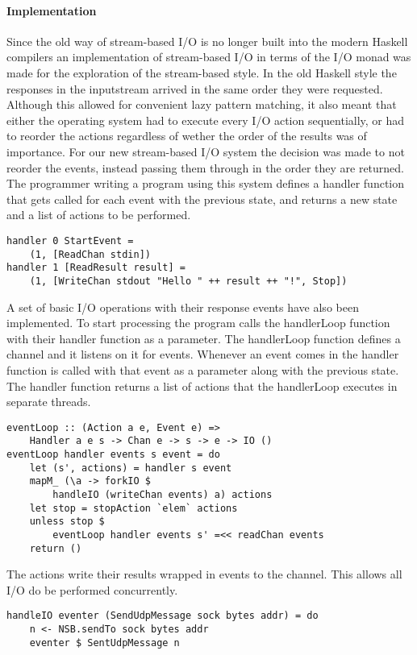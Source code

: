 \paragraph{Implementation}
Since the old way of stream-based I/O is no longer built into the modern Haskell compilers an implementation of stream-based I/O in terms of the I/O monad was made for the exploration of the stream-based style.
In the old Haskell style the responses in the inputstream arrived in the same order they were requested. Although this allowed for convenient lazy pattern matching, it also meant that either the operating system had to execute every I/O action sequentially, or had to reorder the actions regardless of wether the order of the results was of importance. For our new stream-based I/O system the decision was made to not reorder the events, instead passing them through in the order they are returned.
The programmer writing a program using this system defines a handler function that gets called for each event with the previous state, and returns a new state and a list of actions to be performed.
\begin{lstlisting}[caption={Stream-based example}]
handler 0 StartEvent =
    (1, [ReadChan stdin])
handler 1 [ReadResult result] =
    (1, [WriteChan stdout "Hello " ++ result ++ "!", Stop])
\end{lstlisting}
A set of basic I/O operations with their response events have also been implemented.
To start processing the program calls the handlerLoop function with their handler function as a parameter.
The handlerLoop function defines a channel and it listens on it for events. Whenever an event comes in the handler function is called with that event as a parameter along with the previous state. The handler function returns a list of actions that the handlerLoop executes in separate threads. 
\begin{lstlisting}[caption={The eventLoop}]
eventLoop :: (Action a e, Event e) =>
    Handler a e s -> Chan e -> s -> e -> IO ()
eventLoop handler events s event = do
    let (s', actions) = handler s event
    mapM_ (\a -> forkIO $
        handleIO (writeChan events) a) actions
    let stop = stopAction `elem` actions
    unless stop $
        eventLoop handler events s' =<< readChan events
    return ()
\end{lstlisting}
The actions write their results wrapped in events to the channel. This allows all I/O do be performed concurrently.
\begin{lstlisting}[caption={Example of an Action, SendUdpMessage}]
handleIO eventer (SendUdpMessage sock bytes addr) = do
    n <- NSB.sendTo sock bytes addr
    eventer $ SentUdpMessage n
\end{lstlisting}
